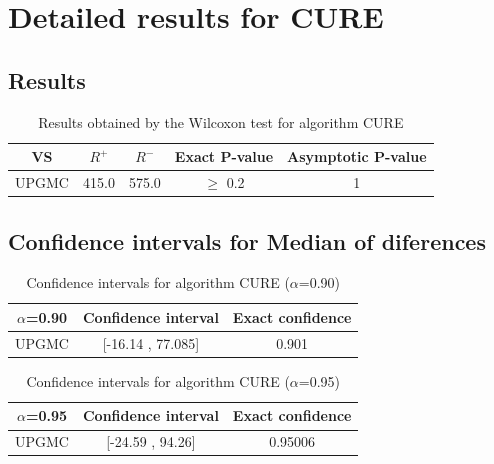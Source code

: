 \documentclass[a4paper,10pt]{article}
\begin{document}
 \clearpage 


\section{Detailed results for CURE}


\subsection{Results}

\begin{table}[!htp]
\centering\small
\begin{tabular}{
|c|c|c|c|c|}
\hline
 VS & $R^{+}$ & $R^{-}$ & Exact P-value & Asymptotic P-value \\ \hline 
UPGMC & 415.0 & 575.0 & $\geq$ 0.2 & 1\\ \hline 

\end{tabular}
\caption{Results obtained by the Wilcoxon test for algorithm CURE}
\end{table}

\subsection{Confidence intervals for Median of diferences}

\begin{table}[!htp]
\centering\small
\begin{tabular}{
|c|c|c|}
\hline
 $\alpha$=0.90 & Confidence interval & Exact confidence \\ \hline 
UPGMC & [-16.14 , 77.085] & 0.901\\ \hline 

\end{tabular}
\caption{Confidence intervals for algorithm CURE ($\alpha$=0.90)}
\end{table}
\begin{table}[!htp]
\centering\small
\begin{tabular}{
|c|c|c|}
\hline
 $\alpha$=0.95 & Confidence interval & Exact confidence \\ \hline 
UPGMC & [-24.59 , 94.26] & 0.95006\\ \hline 

\end{tabular}
\caption{Confidence intervals for algorithm CURE ($\alpha$=0.95)}
\end{table}

 \clearpage 
\end{document}
